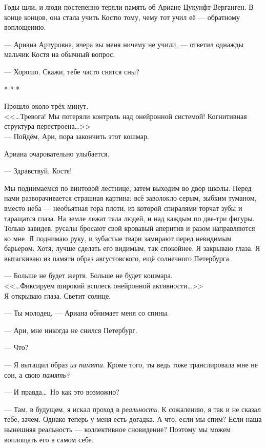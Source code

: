 \documentclass[openany, oneside]{book}
\begin{document}
Годы шли, и люди постепенно теряли память об Ариане Цукунфт-Верганген. В конце концов, она стала учить Костю тому, чему тот учил её --- обратному воплощению.

--- Ариана Артуровна, вчера вы меня ничему не учили, --- ответил однажды мальчик Костя на обычный вопрос.

--- Хорошо. Скажи, тебе часто снятся сны?

\begin{center}
    * * *
\end{center}

Прошло около трёх минут.\\

<<\dots Тревога! Мы потеряли контроль над онейронной системой! Когнитивная структура перестроена\dots>>\\

--- Пойдём, Ари, пора закончить этот кошмар.

Ариана очаровательно улыбается.

--- Здравствуй, Костя!

Мы поднимаемся по винтовой лестнице, затем выходим во двор школы. Перед нами разворачивается страшная картина: всё заволокло серым, зыбким туманом, вместо неба --- необъятная гора плоти, из которой спиралями торчат зубы и таращатся глаза. На земле лежат тела людей, и над каждым по две-три фигуры. Только завидев, русалы бросают свой кровавый аперитив и разом направляются ко мне. Я поднимаю руку, и зубастые твари замирают перед невидимым барьером. Хотя, лучше сделать его видимым, так спокойнее. Я закрываю глаза. Я вытаскиваю из памяти образ августовского, ещё солнечного Петербурга.

--- Больше не будет жертв. Больше не будет кошмара.\\

<<\dots Фиксируем широкий всплеск онейронной активности\dots>>\\

Я открываю глаза. Светит солнце.

--- Ты молодец, --- Ариана обнимает меня со спины.

--- Ари, мне никогда не снился Петербург.

--- Что?

--- Я вытащил образ \textit{из памяти}. Кроме того, ты ведь тоже транслировала мне не сон, а свою \textit{память?}

--- И правда\dots \ Но как это возможно?

--- Там, в будущем, я искал проход в \textit{реальность}. К сожалению, я так и не сказал тебе, зачем. Однако теперь у меня есть догадка. А что, если мы спим? Если наша нынешняя реальность --- коллективное сновидение? Поэтому мы можем воплощать его в самом себе.
\end{document}
